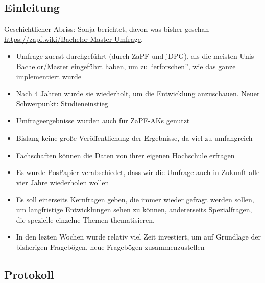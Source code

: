   \subsection*{Einleitung}
    Geschichtlicher Abriss: Sonja berichtet, davon was bisher geschah \url{https://zapf.wiki/Bachelor-Master-Umfrage}. \\
    \begin{itemize}
      \item Umfrage zuerst durchgeführt (durch ZaPF und jDPG), als die meisten Unis Bachelor/Master eingeführt haben, um zu “erforschen”, wie das ganze implementiert wurde
      \item Nach 4 Jahren wurde sie wiederholt, um die Entwicklung anzuschauen. Neuer Schwerpunkt: Studieneinstieg
      \item Umfrageergebnisse wurden auch für ZaPF-AKs genutzt
      \item Bislang keine große Veröffentlichung der Ergebnisse, da viel zu umfangreich
      \item Fachschaften können die Daten von ihrer eigenen Hochschule erfragen
      \item Es wurde PosPapier verabschiedet, dass wir die Umfrage auch in Zukunft alle vier Jahre wiederholen wollen
      \item Es soll einerseits Kernfragen geben, die immer wieder gefragt werden sollen, um langfristige Entwicklungen sehen zu können, andererseits Spezialfragen, die spezielle einzelne Themen thematisieren.
      \item In den lezten Wochen wurde relativ viel Zeit investiert, um auf Grundlage der bisherigen Fragebögen, neue Fragebögen zusammenzustellen
    \end{itemize}

  \subsection*{Protokoll}
